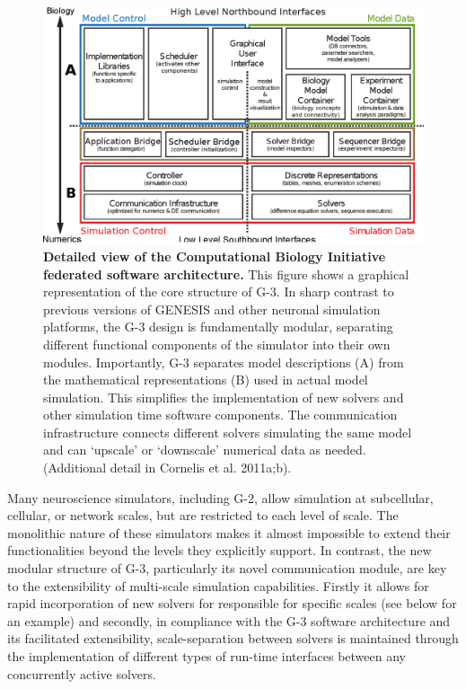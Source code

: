 \documentclass[12pt]{article}
\begin{document}
\begin{figure}
\includegraphics[scale=0.56]{figures/cbi-architecture-expanded.eps}
\caption{\footnotesize {\bf Detailed view of the Computational Biology Initiative
    federated software architecture.}  This figure shows a graphical
  representation of the core structure of G-3. In sharp contrast to
  previous versions of GENESIS and other neuronal simulation
  platforms, the G-3 design is fundamentally modular, separating
  different functional components of the simulator into their own
  modules. Importantly, G-3 separates model descriptions (A) from the
  mathematical representations (B) used in actual model simulation. This
  simplifies the implementation of new solvers and other
  simulation time software components. The communication infrastructure
  connects different solvers simulating the same model and can
  `upscale' or `downscale' numerical data as needed. (Additional
  detail in Cornelis et al. 2011a;b).}
\label{fig:cbi-architecture-expanded}
\end{figure}

Many neuroscience simulators, including G-2, allow simulation at
subcellular, cellular, or network scales, but are restricted
to each level of scale.  The monolithic nature of these simulators makes it
almost impossible to extend their functionalities
beyond the levels they explicitly support. In contrast, the new modular structure of G-3, particularly its novel communication module, are key to the extensibility of multi-scale simulation capabilities.
Firstly it allows for rapid incorporation of new
solvers for responsible for specific scales (see below for an example) and secondly,
in compliance with the G-3 software architecture and its facilitated extensibility, scale-separation between solvers is maintained through the implementation of different types of run-time
interfaces between any concurrently active solvers.
\end{document}

